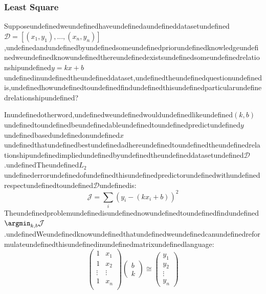 \subsubsection{Least Square}

Supposeundefinedweundefinedhaveundefinedaundefineddatasetundefined$\mathcal D = [(x_1,y_1),...,(x_n, y_n)]$,undefinedandundefinedbyundefinedsomeundefinedpriorundefinedknowledgeundefinedweundefinedknowundefinedthereundefinedexistsundefinedsomeundefinedrelationshipundefined$y=kx + b$undefinedinundefinedtheundefineddataset,undefinedtheundefinedquestionundefinedis,undefinedhowundefinedtoundefinedfindundefinedthisundefinedparticularundefinedrelationshipundefined?

Inundefinedotherword,undefinedweundefinedwouldundefinedlikeundefined$(k,b)$undefinedtoundefinedbeundefinedableundefinedtoundefinedpredictundefined$y$undefinedbasedundefinedonundefined$x$undefinedthatundefinedbestundefinedadhereundefinedtoundefinedtheundefinedrelationshipundefinedimpliedundefinedbyundefinedtheundefineddatasetundefined$\mathcal D$.undefinedTheundefined$L_2$undefinederrorundefinedofundefinedthisundefinedpredictorundefinedwithundefinedrespectundefinedtoundefined$\mathcal D$undefinedis:
\begin{equation}
\mathcal J =\sum_i (y_i-(kx_i+b))^2
\end{equation}
Theundefinedproblemundefinedisundefinednowundefinedtoundefinedfindundefined$\argmin_{k,b} \mathcal J$.undefinedWeundefinedknowundefinedthatundefinedweundefinedcanundefinedreformulateundefinedthisundefinedinundefinedmatrixundefinedlanguage:
\begin{equation}
\begin{pmatrix}
1 & x_1 \\
1 & x_2 \\
\vdots &\vdots \\
1 & x_n \\
\end{pmatrix}
\begin{pmatrix}
b \\ k
\end{pmatrix}
\cong 
\begin{pmatrix}
y_1 \\
y_2 \\
\vdots \\
y_n
\end{pmatrix}
\end{equation}